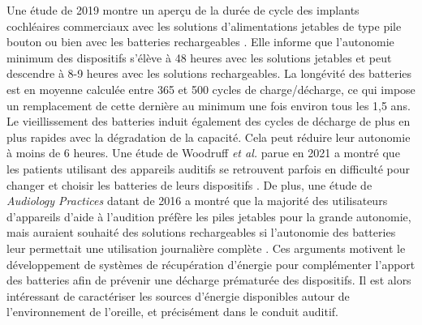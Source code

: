 Une étude de 2019 montre un aperçu de la durée de cycle des implants cochléaires commerciaux avec les solutions d'alimentations jetables de type pile bouton ou bien avec les batteries rechargeables \cite{ASL-Kids2019}. Elle informe que l'autonomie minimum des dispositifs s'élève à 48 heures avec les solutions jetables et peut descendre à 8-9 heures avec les solutions rechargeables. La longévité des batteries est en moyenne calculée entre 365 et 500 cycles de charge/décharge, ce qui impose un remplacement de cette dernière au minimum une fois environ tous les 1,5 ans. Le vieillissement des batteries induit également des cycles de décharge de plus en plus rapides avec la dégradation de la capacité. Cela peut réduire leur autonomie à moins de 6 heures. Une étude de Woodruff \emph{et al.} parue en 2021 a montré que les patients utilisant des appareils auditifs se retrouvent parfois en difficulté pour changer et choisir les batteries de leurs dispositifs \cite{Woodruff2021}. De plus, une étude de \emph{Audiology Practices} datant de 2016 a montré que la majorité des utilisateurs d'appareils d'aide à l'audition préfère les piles jetables pour la grande autonomie, mais auraient souhaité des solutions rechargeables si l'autonomie des batteries leur permettait une utilisation journalière complète \cite{PracticesAudiology2016}. Ces arguments motivent le développement de systèmes de récupération d'énergie pour complémenter l'apport des batteries afin de prévenir une décharge prématurée des dispositifs. Il est alors intéressant de caractériser les sources d'énergie disponibles autour de l'environnement de l'oreille, et précisément dans le conduit auditif.
